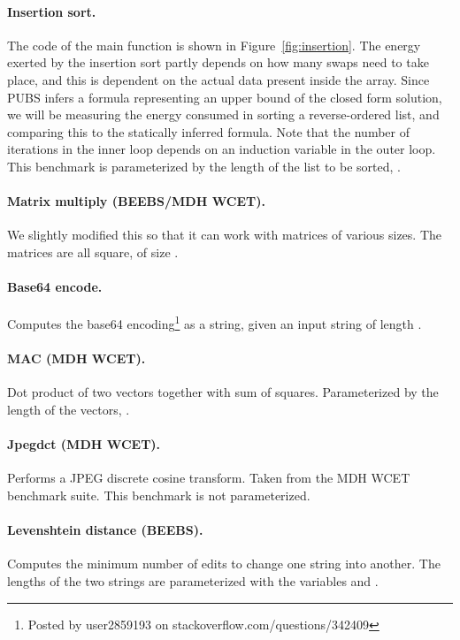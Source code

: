 \documentclass[9pt,preprint]{sigplanconf}
\newcommand{\figref}[1]{Figure~\ref{fig:#1}}
\begin{document}
\paragraph{Insertion sort.}
The code of the main function is shown in \figref{insertion}. The
energy exerted by the insertion sort partly depends on how many swaps need to take
place, and this is dependent on the actual data present inside the array. Since
PUBS infers a formula representing an upper bound of the closed form solution,
we will be measuring the energy consumed in sorting a reverse-ordered list, and
comparing this to the statically 
inferred formula. Note that the number of iterations in the inner loop depends
on an induction variable in the outer loop. This benchmark is parameterized by
the length of the list to be sorted, .

\paragraph{Matrix multiply (BEEBS/MDH WCET).} We slightly
modified this so that it can work with matrices of various sizes. The matrices are all square, of size .

\paragraph{Base64 encode.}
Computes the base64 encoding\footnote{Posted by user2859193 on
  stackoverflow.com/questions/342409} as a string, given an input string of length .

\paragraph{MAC (MDH WCET).} Dot product of two vectors together with sum of
squares. Parameterized by the length of the vectors, .

\paragraph{Jpegdct (MDH WCET).} Performs a JPEG discrete cosine transform. Taken
from the MDH WCET benchmark suite. This benchmark is not parameterized.

\paragraph{Levenshtein distance (BEEBS).} Computes the minimum number of edits to
change one string into another. The lengths of the two strings are
parameterized with the variables  and .
\end{document}
